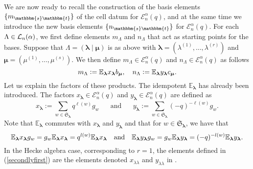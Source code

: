 \documentclass[10pt,a4,twoside,hidelinks,rm]{article}
\newcommand\es{\mathbbm{s}}
\newcommand\et{\mathbbm{t}}
\newcommand{\Si}{\mathfrak{S}}
\newcommand{\Ea}{ {\mathcal E}_n^{\alpha}(q)}
\newcommand\blambda{{\boldsymbol\lambda}}
\newcommand\be{\mathbb{E}}
\newcommand\bmu{{\boldsymbol\mu}}
\theoremstyle{plain}
\begin{document}
\medskip
We are now ready to recall the construction of the basis elements $ \{ m_{\es\et} \} $ of the cell datum for
$ \Ea$, and at the same time we
introduce the new basis elements $ \{ n_{\es\et} \} $
for $ \Ea$.
For each $ \Lambda \in {\cal L}_n(\alpha) $, we first define 
elements $ m_{\Lambda} $ and $ n_{\Lambda} $ that act as starting points for the bases.
Suppose that $ \Lambda = (\blambda \mid \bmu ) $ is as above
with $ \blambda = (\lambda^{(1)}, \ldots, \lambda^{(r)}) $ and $ \bmu = (\mu^{(1)}, \ldots,\mu^{(s)})$.
We then define $ m_{\Lambda}  \in  \Ea $ and $ n_{\Lambda} \in \Ea$ as follows
\begin{equation}{\label{startingbasiselement}}
  m_{\Lambda}:= {\be}_{\blambda}   x_{\blambda}     b_{\bmu}, \, \, \, \, \, \, 
  n_{\Lambda}:= {\be}_{\blambda}   y_{\blambda}     c_{\bmu}.
\end{equation}
Let us explain the factors of these products.
The idempotent ${\be}_{\blambda} $ has already been introduced.
The factors $ x_{\blambda} \in \Ea $ and $ y_{\blambda} \in \Ea $
are defined as
\begin{equation}\label{secondlyfirst} x_{\blambda} :=  \sum_{w\in\Si_{\blambda}}q^{\ell(w)}g_{w}
\, \, \, \, \, \, \, \, 
\mbox{   and     }
\, \, \, \, \, \, \, \, 
y_{\blambda} :=  \sum_{w\in\Si_{\blambda}}(-q)^{-\ell(w)}g_{w}.
\end{equation}
Note that $ {\be}_{\blambda} $ commutes with $ x_{\blambda} $ and $ y_{\blambda} $ and that 
for $  w \in \Si_{\blambda} $, we have that
\begin{equation}{\label{justasinYH}}
{\be}_{\blambda} x_{\blambda} g_w = g_w  {\be}_{\blambda} x_{\blambda} = q^{l(w)} {\be}_{\blambda} x_{\blambda} \, \, \, \, \mbox{  and     } \, \, \, \,
{\be}_{\blambda} y_{\blambda} g_w = g_w  {\be}_{\blambda} y_{\blambda}
= (-q)^{-l(w)} {\be}_{\blambda} y_{\blambda}.
\end{equation}
In the Hecke algebra case, corresponding to $ r=1$, the elements defined in (\ref{secondlyfirst})
are the elements denoted 
$  x_{\lambda \lambda} $ and $  y_{\lambda \lambda} $ in \cite{Mur95}.
\end{document}

